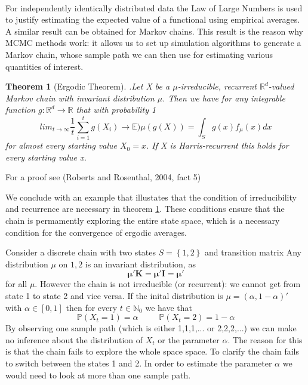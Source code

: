 \documentclass[a4paper,10pt]{article}
\newtheorem{theorem}{Theorem}[section]
\newenvironment{proof}[1][Proof]{\begin{trivlist}
\item[\hskip \labelsep {\bfseries #1}]}{\end{trivlist}}
\newenvironment{example}[1][Example]{\begin{trivlist}
\item[\hskip \labelsep {\bfseries #1}]}{\end{trivlist}}
\newcommand{\qed}{\nobreak \ifvmode \relax \else
      \ifdim\lastskip<1.5em \hskip-\lastskip
      \hskip1.5em plus0em minus0.5em \fi \nobreak
      \vrule height0.75em width0.5em depth0.25em\fi}
\begin{document}
\paragraph{} 
   For independently identically distributed data the Law of Large Numbers is used to justify estimating 
  the expected value of a functional using empirical averages. A similar result can be obtained for Markov
  chains. This result is the reason why MCMC methods work: it allows us to set up simulation
  algorithms to generate a Markov chain, whose sample path we can then use for estimating various quantities
  of interest.
  \begin{theorem}[Ergodic Theorem].\label{ergodic}
   Let X be a $\mu$-irreducible, recurrent $\mathbb{R}^{d}$-valued Markov chain with invariant
   distribution $\mu$. Then we have for any integrable function $g: \mathbb{R}^{d} \rightarrow \mathbb{R}$ that
   with probability 1
   \begin{equation*}
   lim_{t \rightarrow \infty} \frac{1}{t} \sum^{t}_{i=1} g(X_{i}) \rightarrow \mathbb{E}){\mu}(g(X)) = 
   \int_S g(x)f_{\mu}(x)dx
   \end{equation*}
for almost every starting value $X_0 = x$. If X is Harris-recurrent this holds for every starting value x. 
  \end{theorem}
\begin{proof}
 For a proof see (Roberts and Rosenthal, 2004, fact 5)
\end{proof}
We conclude with an example that illustates that the condition of irreducibility and recurrence are necessary in 
theorem \ref{ergodic}. These conditions ensure that the chain is permamently exploring the entire state space,
which is a necessary condition for the convergence of ergodic averages. 

   \begin{example}
    Consider a discrete chain with two states $S = \left\lbrace  1,2 \right\rbrace$ and transition matrix
 Any distribution $\mu$ on ${1,2}$ is an invariant distribution, as 
 \begin{equation*}
  \mathbf{\mu ' K = \mu ' I = \mu '}
 \end{equation*}
for all $\mu$. However the chain is not irreducible (or recurrent): we cannot get from state 1 to state 2 and vice versa. 
If the inital distribution is $\mu = (\alpha, 1 - \alpha)'$ with $\alpha \in [0,1]$ then for every 
$t \in \mathbb{N}_{0}$ we have that 
\begin{equation*}
 \mathbb{P}(X_t = 1) = \alpha \;\;\;\;\;\;\;\;\; \mathbb{P}(X_t = 2) = 1 - \alpha
\end{equation*}
By observing one sample path (which is either 1,1,1,... or 2,2,2,...) we can make no inference about the
distribution of $X_t$ or the parameter $\alpha$. The reason for this is that the chain fails to explore the whole space 
space. To clarify the chain fails to switch between the states 1 and 2. In order to estimate the parameter $\alpha$
we would need to look at more than one sample path. \qed
 \end{example}
\end{document}
